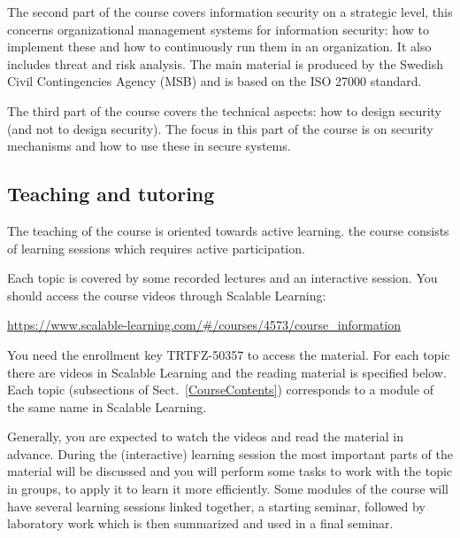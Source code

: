 The second part of the course covers information security on a strategic level, 
this concerns organizational management systems for information security: how 
to implement these and how to continuously run them in an organization.
It also includes threat and risk analysis.
The main material is produced by the Swedish Civil Contingencies Agency (MSB) 
and is based on the ISO 27000 standard.

The third part of the course covers the technical aspects: how to design 
security (and not to design security).
The focus in this part of the course is on security mechanisms and how to use 
these in secure systems.

\subsection{Teaching and tutoring}


The teaching of the course is oriented towards active learning.
\Ie the course consists of learning sessions which requires active 
participation.

Each topic is covered by some recorded lectures and an interactive session.
You should access the course videos through Scalable Learning:
\begin{center}
  \url{https://www.scalable-learning.com/#/courses/4573/course_information}
\end{center}
You need the enrollment key TRTFZ-50357 to access the material.
For each topic there are videos in Scalable Learning and the reading material 
is specified below.
Each topic (subsections of Sect.~\ref{CourseContents}) corresponds to a module 
of the same name in Scalable Learning.

Generally, you are expected to watch the videos and read the material in 
advance.
During the (interactive) learning session the most important parts of the 
material will be discussed and you will perform some tasks to work with the 
topic in groups, \ie to apply it to learn it more efficiently.
Some modules of the course will have several learning sessions linked together,
\eg a starting seminar, followed by laboratory work which is then summarized 
and used in a final seminar.

